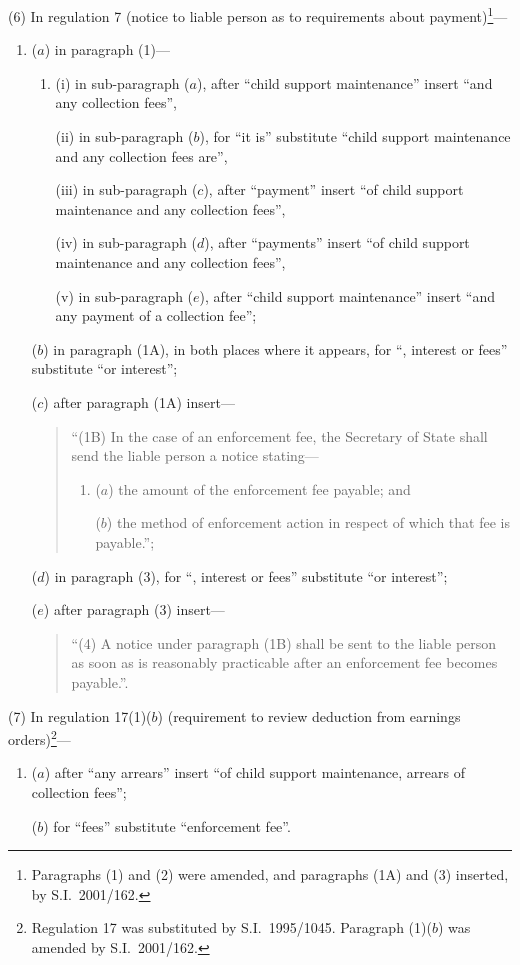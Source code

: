\documentclass[12pt,a4paper]{article}
\begin{document}
(6) In regulation 7 (notice to liable person as to requirements about payment)\footnote{Paragraphs (1) and (2) were amended, and paragraphs (1A) and (3) inserted, by S.I.~2001/162.}—
\begin{enumerate}\item[]
($a$) in paragraph (1)—
\begin{enumerate}\item[]
(i) in sub-paragraph ($a$), after “child support maintenance” insert “and any collection fees”,

(ii) in sub-paragraph ($b$), for “it is” substitute “child support maintenance and any collection fees are”,

(iii) in sub-paragraph ($c$), after “payment” insert “of child support maintenance and any collection fees”,

(iv) in sub-paragraph ($d$), after “payments” insert “of child support maintenance and any collection fees”,

(v) in sub-paragraph ($e$), after “child support maintenance” insert “and any payment of a collection fee”;
\end{enumerate}

($b$) in paragraph (1A), in both places where it appears, for “, interest or fees” substitute “or interest”;

($c$) after paragraph (1A) insert—
\begin{quotation}
“(1B) In the case of an enforcement fee, the Secretary of State shall send the liable person a notice stating—
\begin{enumerate}\item[]
($a$) the amount of the enforcement fee payable; and

($b$) the method of enforcement action in respect of which that fee is payable.”;
\end{enumerate}
\end{quotation}

($d$) in paragraph (3), for “, interest or fees” substitute “or interest”;

($e$) after paragraph (3) insert—
\begin{quotation}
“(4) A notice under paragraph (1B) shall be sent to the liable person as soon as is reasonably practicable after an enforcement fee becomes payable.”.
\end{quotation}
\end{enumerate}

(7) In regulation 17(1)($b$)  (requirement to review deduction from earnings orders)\footnote{Regulation 17 was substituted by S.I.~1995/1045. Paragraph (1)($b$)  was amended by S.I.~2001/162.}—
\begin{enumerate}\item[]
($a$) after “any arrears” insert “of child support maintenance, arrears of collection fees”;

($b$) for “fees” substitute “enforcement fee”.
\end{enumerate}
\end{document}
